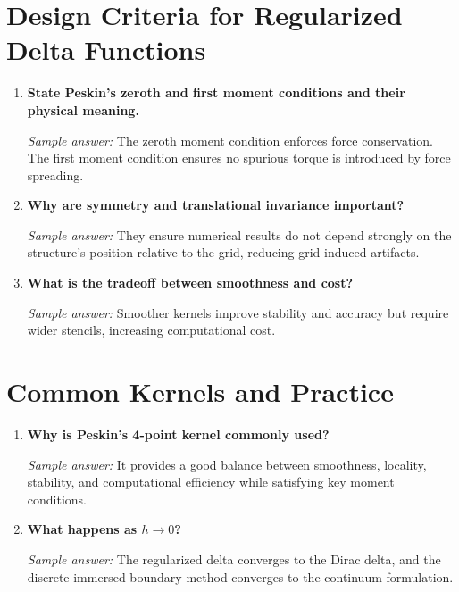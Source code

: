 \documentclass[11pt]{article}
\begin{document}
\section*{Design Criteria for Regularized Delta Functions}

\begin{enumerate}[label=\arabic*., resume]

\item \textbf{State Peskin’s zeroth and first moment conditions and their physical meaning.}

\textit{Sample answer:}  
The zeroth moment condition enforces force conservation.  
The first moment condition ensures no spurious torque is introduced by force spreading.

\item \textbf{Why are symmetry and translational invariance important?}

\textit{Sample answer:}  
They ensure numerical results do not depend strongly on the structure’s position relative to the grid, reducing grid-induced artifacts.

\item \textbf{What is the tradeoff between smoothness and cost?}

\textit{Sample answer:}  
Smoother kernels improve stability and accuracy but require wider stencils, increasing computational cost.

\end{enumerate}

\section*{Common Kernels and Practice}

\begin{enumerate}[label=\arabic*., resume]

\item \textbf{Why is Peskin’s 4-point kernel commonly used?}

\textit{Sample answer:}  
It provides a good balance between smoothness, locality, stability, and computational efficiency while satisfying key moment conditions.

\item \textbf{What happens as $h \to 0$?}

\textit{Sample answer:}  
The regularized delta converges to the Dirac delta, and the discrete immersed boundary method converges to the continuum formulation.

\end{enumerate}
\end{document}
